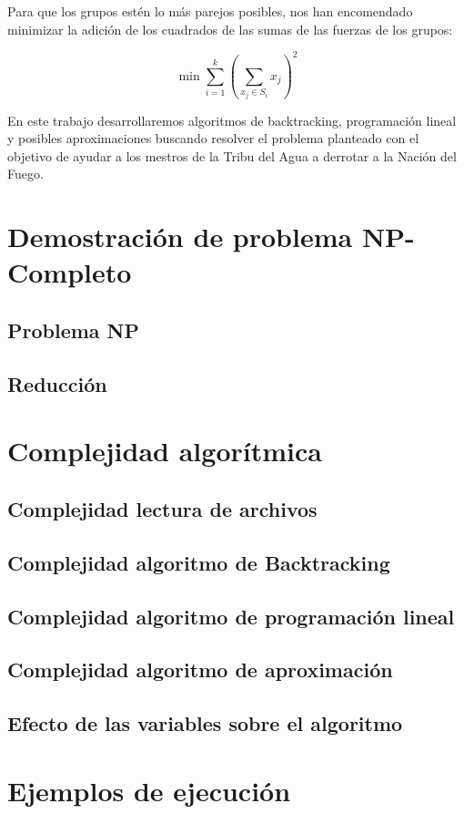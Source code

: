 \documentclass{article}
\begin{document}
Para que los grupos estén lo más parejos posibles, nos han encomendado minimizar la adición de los cuadrados de las sumas de las fuerzas de los grupos:

$$
\min \sum_{i=1}^{k} \left( \sum_{x_j \in S_i} x_j \right)^2
$$

En este trabajo desarrollaremos algoritmos de backtracking, programación lineal y posibles aproximaciones buscando resolver el problema planteado con el objetivo de ayudar a los mestros de la Tribu del Agua a derrotar a la Nación del Fuego.

\section{Demostración de problema NP-Completo}
\subsection{Problema NP}
\subsection{Reducción}

\section{Complejidad algorítmica}
\subsection{Complejidad lectura de archivos}

\subsection{Complejidad algoritmo de Backtracking}
\subsection{Complejidad algoritmo de programación lineal}
\subsection{Complejidad algoritmo de aproximación}

\subsection{Efecto de las variables sobre el algoritmo}

\section{Ejemplos de ejecución}
\label{sec:ejemplos}
\end{document}
